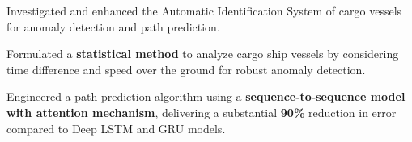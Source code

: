 \documentclass[]{deedy-resume-openfont}
\begin{document}
\begin{minipage}[t]{0.66\textwidth}
\item Investigated and enhanced the Automatic Identification System of cargo vessels for anomaly detection and path prediction.
\begin{tightemize}
        \item Formulated a \textbf{statistical method} to analyze cargo ship vessels by considering time difference and speed over the ground for robust anomaly detection.
        \item Engineered a path prediction algorithm using a \textbf{sequence-to-sequence model with attention mechanism}, delivering a substantial \textbf{90\%} reduction in error compared to Deep LSTM and GRU models.
\end{tightemize}
\sectionsep













\end{minipage}%
\end{document}
